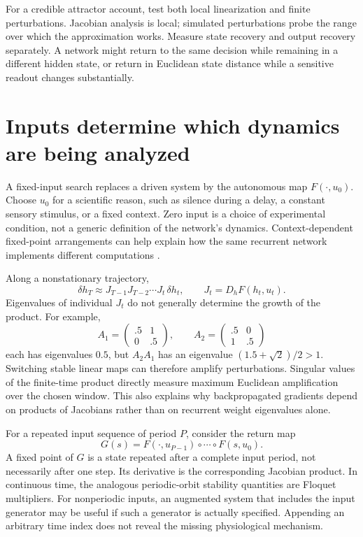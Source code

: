 For a credible attractor account, test both local linearization and finite perturbations. Jacobian analysis is local; simulated perturbations probe the range over which the approximation works. Measure state recovery and output recovery separately. A network might return to the same decision while remaining in a different hidden state, or return in Euclidean state distance while a sensitive readout changes substantially.

\section{Inputs determine which dynamics are being analyzed}
A fixed-input search replaces a driven system by the autonomous map $F(\cdot,u_0)$. Choose $u_0$ for a scientific reason, such as silence during a delay, a constant sensory stimulus, or a fixed context. Zero input is a choice of experimental condition, not a generic definition of the network's dynamics. Context-dependent fixed-point arrangements can help explain how the same recurrent network implements different computations \citep{app_mante2013}.

Along a nonstationary trajectory,
\begin{equation}
 \delta h_T\approx J_{T-1}J_{T-2}\cdots J_t\,\delta h_t,
 \qquad J_t=D_hF(h_t,u_t).\label{eq:10-products}
\end{equation}
Eigenvalues of individual $J_t$ do not generally determine the growth of the product. For example,
\[
 A_1=\begin{pmatrix}.5&1\\0&.5\end{pmatrix},\qquad
 A_2=\begin{pmatrix}.5&0\\1&.5\end{pmatrix}
\]
each has eigenvalues $0.5$, but $A_2A_1$ has an eigenvalue $(1.5+\sqrt2)/2>1$. Switching stable linear maps can therefore amplify perturbations. Singular values of the finite-time product directly measure maximum Euclidean amplification over the chosen window. This also explains why backpropagated gradients depend on products of Jacobians rather than on recurrent weight eigenvalues alone.

For a repeated input sequence of period $P$, consider the return map
\[
 G(s)=F(\cdot,u_{P-1})\circ\cdots\circ F(s,u_0).
\]
A fixed point of $G$ is a state repeated after a complete input period, not necessarily after one step. Its derivative is the corresponding Jacobian product. In continuous time, the analogous periodic-orbit stability quantities are Floquet multipliers. For nonperiodic inputs, an augmented system that includes the input generator may be useful if such a generator is actually specified. Appending an arbitrary time index does not reveal the missing physiological mechanism.

